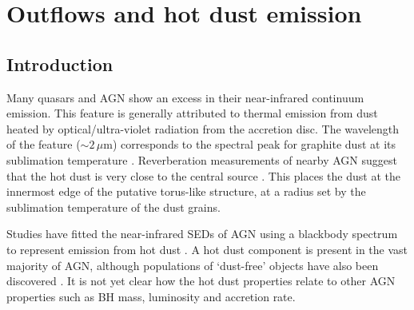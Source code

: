 
\chapter{Outflows and hot dust emission}
\label{ch:sed} 



\section{Introduction}

Many quasars and AGN show an excess in their near-infrared continuum emission. 
This feature is generally attributed to thermal emission from dust heated by optical/ultra-violet radiation from the accretion disc. 
The wavelength of the feature ($\sim2$\,$\mu$m) corresponds to the spectral peak for graphite dust at its sublimation temperature \citep[${\mathrm T}\sim1500$\,K;][]{barvainis87}. 
Reverberation measurements of nearby AGN suggest that the hot dust is very close to the central source \citep[few tens of light days; e.g.][]{minezaki04,suganuma06}.
This places the dust at the innermost edge of the putative torus-like structure, at a radius set by the sublimation temperature of the dust grains.  

Studies have fitted the near-infrared SEDs of AGN using a blackbody spectrum to represent emission from hot dust \citep[e.g.][]{edelson86,barvainis87,kishimoto07,mor09,riffel09,deo11,landt11,mor11,roseboom13}. 
A hot dust component is present in the vast majority of AGN, although populations of `dust-free' objects have also been discovered \citep{hao10,hao11,jiang10,mor11}. 
It is not yet clear how the hot dust properties relate to other AGN properties such as BH mass, luminosity and accretion rate. 

